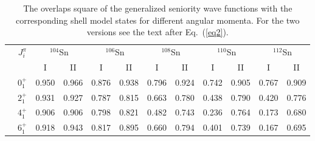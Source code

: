 \begin{table}[htbp]
\begin{center}
\caption{ The overlaps square  of the generalized seniority wave functions
with the corresponding shell model states for different angular momenta.
For the two versions see the text after Eq.~(\ref{eq2}).}
\begin{tabular}{cccccccccccc}
& {$J^{\pi}_i$} & \multicolumn{2}{c}{$^{104}$Sn} & 
\multicolumn{2}{c}{$^{106}$Sn} & \multicolumn{2}{c}{$^{108}$Sn} & 
\multicolumn{2}{c}{$^{110}$Sn} & \multicolumn{2}{c}{$^{112}$Sn} \\
& & I & II & I & II & I & II & I & II & I & II \\
\hline
& $0^{+}_{1}$ & 0.950 & 0.966 & 0.876 & 0.938 & 0.796 & 0.924 &
                0.742 & 0.905 & 0.767& 0.909 \\
& $2^{+}_{1}$ & 0.931 & 0.927 & 0.787 & 0.815 & 0.663 & 0.780 & 
                0.438 & 0.790 & 0.420 & 0.776 \\
& $4^{+}_{1}$ & 0.906 & 0.906 & 0.798 & 0.821 & 0.482 & 0.743 & 
                0.236 & 0.764 & 0.173& 0.680 \\
& $6^{+}_{1}$ & 0.918 & 0.943 & 0.817& 0.895 & 0.660 & 0.794 & 
                0.401 & 0.739 & 0.167& 0.695 \\
\end{tabular}
\end{center}
\label{tab-2}
\end{table}




